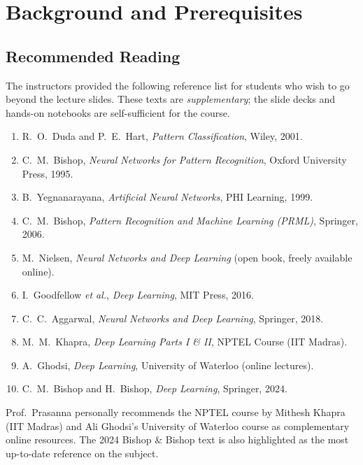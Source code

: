 \documentclass[12pt,a4paper]{article}
\begin{document}
\section{Background and Prerequisites}
\label{sec:background}

\subsection{Recommended Reading}
\label{subsec:books}

The instructors provided the following reference list for students who wish to
go beyond the lecture slides.  These texts are \emph{supplementary}; the
slide decks and hands-on notebooks are self-sufficient for the course.

\begin{enumerate}[label=\arabic*.]
  \item R.\ O.\ Duda and P.\ E.\ Hart, \emph{Pattern Classification},
        Wiley, 2001.
  \item C.\ M.\ Bishop, \emph{Neural Networks for Pattern Recognition},
        Oxford University Press, 1995.
  \item B.\ Yegnanarayana, \emph{Artificial Neural Networks},
        PHI Learning, 1999.
  \item C.\ M.\ Bishop, \emph{Pattern Recognition and Machine Learning (PRML)},
        Springer, 2006.
  \item M.\ Nielsen, \emph{Neural Networks and Deep Learning} (open book,
        freely available online).
  \item I.\ Goodfellow \emph{et al.}, \emph{Deep Learning},
        MIT Press, 2016.
  \item C.\ C.\ Aggarwal, \emph{Neural Networks and Deep Learning},
        Springer, 2018.
  \item M.\ M.\ Khapra, \emph{Deep Learning Parts I \& II},
        NPTEL Course (IIT Madras).
  \item A.\ Ghodsi, \emph{Deep Learning},
        University of Waterloo (online lectures).
  \item C.\ M.\ Bishop and H.\ Bishop, \emph{Deep Learning},
        Springer, 2024.
\end{enumerate}

\begin{keyinsight}
Prof.\ Prasanna personally recommends the NPTEL course by Mithesh Khapra
(IIT Madras) and Ali Ghodsi's University of Waterloo course as complementary
online resources.  The 2024 Bishop \& Bishop text is also highlighted as the
most up-to-date reference on the subject.
\end{keyinsight}
\end{document}
